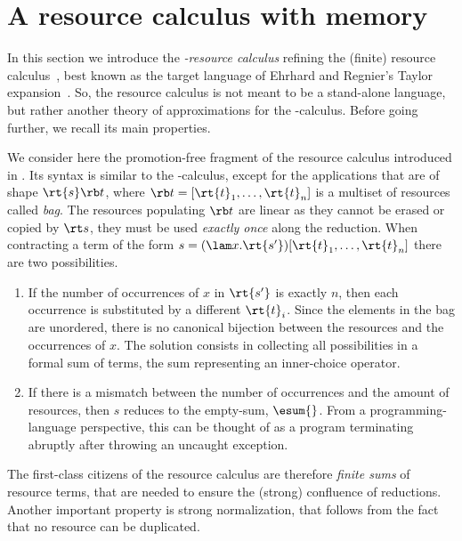 
\section{A resource calculus with memory}
\label{sec:resource}


In this section we introduce the \emph{\lamI-resource calculus} refining the (finite) resource calculus~\cite{EhrhardR03}, best known as the target language of Ehrhard and Regnier's Taylor expansion~\cite{Ehrhard.Reg.08}. 
So, the resource calculus is not meant to be a stand-alone language, but rather another theory of approximations for the \lam-calculus.
Before going further, we recall its main properties.


We consider here the promotion-free fragment of the resource calculus introduced in \cite{PaganiT09}.
Its syntax is similar to the \lam-calculus, except for the applications that are of shape $\rt{s}\rb t$, where $\rb t = [\rt{t}_1,\dots,\rt{t}_n]$ is a multiset of resources called \emph{bag}.
The resources populating $\rb t$ are linear as they cannot be erased or copied by $\rt s$, they must be used \emph{exactly once} along the reduction. 
When contracting a term of the form $s = (\lam x.\rt{s'})[\rt{t}_1,\dots,\rt{t}_n]$ there are two possibilities.
\begin{enumerate}
\item If the number of occurrences of $x$ in $\rt{s'}$ is exactly $n$, then each occurrence is substituted by a different $\rt{t}_i$. 
Since the elements in the bag are unordered, there is no canonical bijection between the resources and the occurrences of $x$. 
The solution consists in collecting all possibilities in a formal sum of terms, the sum representing an inner-choice operator.
\item If there is a mismatch between the number of occurrences and the amount of resources, then $s$ reduces to the empty-sum, $\esum{}$. From a programming-language perspective, this can be thought of as a program terminating abruptly after throwing an uncaught exception.
\end{enumerate}
The first-class citizens of the resource calculus are therefore \emph{finite sums} of resource terms, that are needed to ensure the (strong) confluence of reductions. Another important property is strong normalization, that follows from the fact that no resource can be duplicated.


